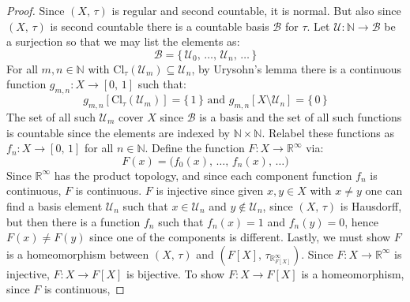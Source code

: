 \documentclass{article}
\theoremstyle{plain}
\theoremstyle{normal}
\begin{document}
        \begin{proof}
            Since $(X,\,\tau)$ is regular and second countable, it is normal.
            But also since $(X,\,\tau)$ is second countable there is a countable
            basis $\mathcal{B}$ for $\tau$. Let
            $\mathcal{U}:\mathbb{N}\rightarrow\mathcal{B}$ be a surjection so
            that we may list the elements as:
            \begin{equation}
                \mathcal{B}=
                \{\,\mathcal{U}_{0},\,\dots,\,\mathcal{U}_{n},\,\dots\,\}
            \end{equation}
            For all $m,n\in\mathbb{N}$ with
            $\textrm{Cl}_{\tau}(\mathcal{U}_{m})\subseteq\mathcal{U}_{n}$,
            by Urysohn's lemma there is a continuous function
            $g_{m,n}:X\rightarrow[0,\,1]$ such that:
            \begin{equation}
                g_{m,n}[\textrm{Cl}_{\tau}(\mathcal{U}_{m})]=\{\,1\,\}
                \textrm{ and }
                g_{m,n}[X\setminus\mathcal{U}_{n}]=\{\,0\,\}
            \end{equation}
            The set of all such $\mathcal{U}_{m}$ cover $X$ since $\mathcal{B}$
            is a basis and the set of all such functions is countable since
            the elements are indexed by $\mathbb{N}\times\mathbb{N}$. Relabel
            these functions as $f_{n}:X\rightarrow[0,\,1]$ for all
            $n\in\mathbb{N}$. Define the function
            $F:X\rightarrow\mathbb{R}^{\infty}$ via:
            \begin{equation}
                F(x)=\big(f_{0}(x),\,\dots,\,f_{n}(x),\,\dots)
            \end{equation}
            Since $\mathbb{R}^{\infty}$ has the product topology, and since each
            component function $f_{n}$ is continuous, $F$ is continuous. $F$
            is injective since given $x,y\in{X}$ with $x\ne{y}$ one can find
            a basis element $\mathcal{U}_{n}$ such that $x\in\mathcal{U}_{n}$
            and $y\notin\mathcal{U}_{n}$, since $(X,\,\tau)$ is Hausdorff, but
            then there is a function $f_{n}$ such that $f_{n}(x)=1$ and
            $f_{n}(y)=0$, hence $F(x)\ne{F}(y)$ since one of the components
            is different. Lastly, we must show $F$ is a homeomorphism between
            $(X,\,\tau)$ and $(F[X],\,\tau_{\mathbb{R}^{\infty}_{F[X]}})$.
            Since $F:X\rightarrow\mathbb{R}^{\infty}$ is injective,
            $F:X\rightarrow{F}[X]$ is bijective. To show
            $F:X\rightarrow{F}[X]$ is a homeomorphism, since $F$ is continuous,

\end{proof}
\end{document}
